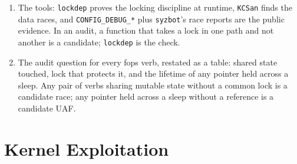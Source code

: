 \documentclass[12pt]{Training}
\begin{document}
\begin{enumerate}
    \item The tools: \lstinline{lockdep} proves the locking discipline at runtime, \lstinline{KCSan} finds the data races, and \lstinline{CONFIG_DEBUG_*} plus \lstinline{syzbot}'s race reports are the public evidence. In an audit, a function that takes a lock in one path and not another is a candidate; \lstinline{lockdep} is the check.
    \item The audit question for every fops verb, restated as a table: shared state touched, lock that protects it, and the lifetime of any pointer held across a sleep. Any pair of verbs sharing mutable state without a common lock is a candidate race; any pointer held across a sleep without a reference is a candidate UAF.
\end{enumerate}

\section*{Kernel Exploitation}
\end{document}
